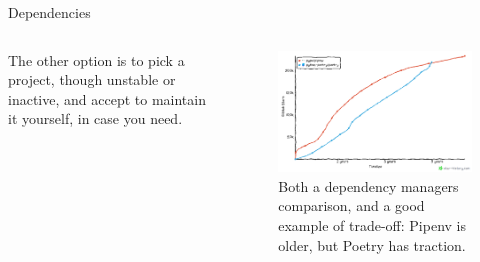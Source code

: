 \documentclass[9pt]{beamer}
\begin{document}
\begin{frame}{Dependencies}
\begin{columns}
\begin{column}{0.5\textwidth}
            The other option is to pick a project, though unstable or inactive,
            and accept to maintain it yourself, in case you need.
        \end{column}
        \begin{column}{0.5\textwidth}
            \begin{figure}
                \centering
                \begin{tcolorbox}[size=tight,sharpish corners,boxrule=0mm]
                    \includegraphics[width=\textwidth]{poetry-vs-pipenv}
                \end{tcolorbox}
                \caption{
                    Both a dependency managers comparison, and a good example
                    of trade-off: Pipenv is older, but Poetry has traction.
                }
            \end{figure}
        \end{column}
    \end{columns}
\end{frame}
\end{document}
